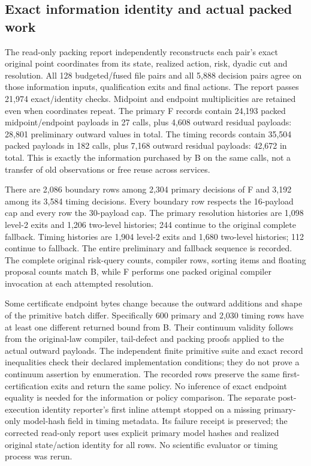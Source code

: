 







\subsection{Exact information identity and actual packed work}
The read-only packing report independently reconstructs each pair's
exact original point coordinates from its state, realized action,
risk, dyadic cut and resolution.  All 128 budgeted/fused file pairs
and all 5,888 decision pairs agree on those information inputs,
qualification exits and final actions.  The report passes 21,974
exact/identity checks.  Midpoint and endpoint multiplicities are
retained even when coordinates repeat.  The primary F records contain
24,193 packed midpoint/endpoint payloads in 27 calls, plus 4,608
outward residual payloads: 28,801 preliminary outward values in total.
The timing records contain 35,504 packed payloads in 182 calls, plus
7,168 outward residual payloads: 42,672 in total.  This is exactly
the information purchased by B on the same calls, not a transfer of
old observations or free reuse across services.

There are 2,086 boundary rows among 2,304 primary decisions of F and
3,192 among its 3,584 timing decisions.  Every boundary row respects
the 16-payload cap and every row the 30-payload cap.  The primary
resolution histories are 1,098 level-2 exits and 1,206 two-level
histories; 244 continue to the original complete fallback.  Timing
histories are 1,904 level-2 exits and 1,680 two-level histories;
112 continue to fallback.  The entire preliminary and fallback
sequence is recorded.  The complete original risk-query counts,
compiler rows, sorting items and floating proposal counts match B,
while F performs one packed original compiler invocation at each
attempted resolution.

Some certificate endpoint bytes change because the outward additions
and shape of the primitive batch differ.  Specifically 600 primary
and 2,030 timing rows have at least one different returned bound from
B.  Their continuum validity follows from the original-law compiler,
tail-defect and packing proofs applied to the actual outward payloads.
The independent finite primitive suite and exact record inequalities
check their declared implementation conditions; they do not prove a
continuum assertion by enumeration. The recorded rows preserve the same
first-certification exits and return the same policy.  No inference of exact endpoint equality is
needed for the information or policy comparison.  The separate
post-execution identity reporter's first inline attempt stopped on a
missing primary-only model-hash field in timing metadata.  Its failure
receipt is preserved; the corrected read-only report uses explicit
primary model hashes and realized original state/action identity for
all rows.  No scientific evaluator or timing process was rerun.

